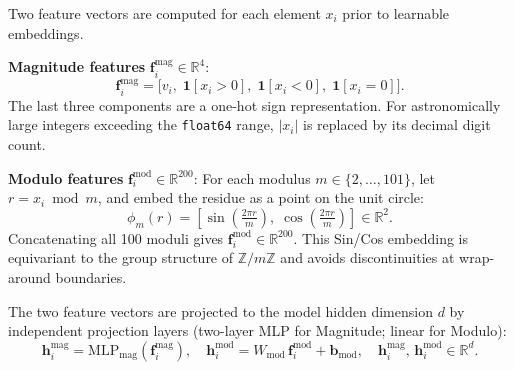 Two feature vectors are computed for each element $x_i$ prior to learnable embeddings.

\textbf{Magnitude features} $\mathbf{f}_i^{\text{mag}} \in \mathbb{R}^4$:
\[
  \mathbf{f}_i^{\text{mag}} = \bigl[v_i,\;\mathbf{1}[x_i > 0],\;\mathbf{1}[x_i < 0],\;\mathbf{1}[x_i = 0]\bigr].
\]
The last three components are a one-hot sign representation. For astronomically large integers
exceeding the \texttt{float64} range, $|x_i|$ is replaced by its decimal digit count.

\textbf{Modulo features} $\mathbf{f}_i^{\text{mod}} \in \mathbb{R}^{200}$:
For each modulus $m \in \{2, \ldots, 101\}$, let $r = x_i \bmod m$, and embed the residue as
a point on the unit circle:
\[
  \phi_m(r) = \left[\sin\!\left(\tfrac{2\pi r}{m}\right),\;\cos\!\left(\tfrac{2\pi r}{m}\right)\right] \in \mathbb{R}^2.
\]
Concatenating all 100 moduli gives $\mathbf{f}_i^{\text{mod}} \in \mathbb{R}^{200}$.
This Sin/Cos embedding is equivariant to the group structure of $\mathbb{Z}/m\mathbb{Z}$ and
avoids discontinuities at wrap-around boundaries.

The two feature vectors are projected to the model hidden dimension $d$ by independent
projection layers (two-layer MLP for Magnitude; linear for Modulo):
\[
  \mathbf{h}_i^{\text{mag}} = \mathrm{MLP}_{\text{mag}}\!\left(\mathbf{f}_i^{\text{mag}}\right),
  \quad
  \mathbf{h}_i^{\text{mod}} = W_{\text{mod}}\,\mathbf{f}_i^{\text{mod}} + \mathbf{b}_{\text{mod}},
  \quad \mathbf{h}_i^{\text{mag}},\,\mathbf{h}_i^{\text{mod}} \in \mathbb{R}^d.
\]

